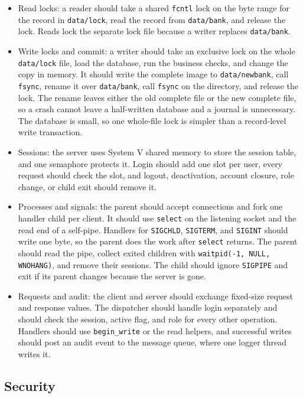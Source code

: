 \documentclass[11pt,a4paper]{article}
\begin{document}
\begin{itemize}
\item Read locks: a reader should take a shared \texttt{fcntl} lock on the byte range for the record in \texttt{data/lock}, read the record from \texttt{data/bank}, and release the lock. Reads lock the separate lock file because a writer replaces \texttt{data/bank}.
\item Write locks and commit: a writer should take an exclusive lock on the whole \texttt{data/lock} file, load the database, run the business checks, and change the copy in memory. It should write the complete image to \texttt{data/newbank}, call \texttt{fsync}, rename it over \texttt{data/bank}, call \texttt{fsync} on the directory, and release the lock. The rename leaves either the old complete file or the new complete file, so a crash cannot leave a half-written database and a journal is unnecessary. The database is small, so one whole-file lock is simpler than a record-level write transaction.
\item Sessions: the server uses System V shared memory to store the session table, and one semaphore protects it. Login should add one slot per user, every request should check the slot, and logout, deactivation, account closure, role change, or child exit should remove it.
\item Processes and signals: the parent should accept connections and fork one handler child per client. It should use \texttt{select} on the listening socket and the read end of a self-pipe. Handlers for \texttt{SIGCHLD}, \texttt{SIGTERM}, and \texttt{SIGINT} should write one byte, so the parent does the work after \texttt{select} returns. The parent should read the pipe, collect exited children with \texttt{waitpid(-1, NULL, WNOHANG)}, and remove their sessions. The child should ignore \texttt{SIGPIPE} and exit if its parent changes because the server is gone.
\item Requests and audit: the client and server should exchange fixed-size request and response values. The dispatcher should handle login separately and should check the session, active flag, and role for every other operation. Handlers should use \texttt{begin\_write} or the read helpers, and successful writes should post an audit event to the message queue, where one logger thread writes it.
\end{itemize}

\subsection{Security}
\end{document}
